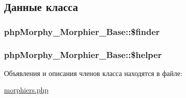 \subsection{Данные класса}
\hypertarget{classphpMorphy__Morphier__Base_a35c13fe01eec04a260e2141203ef4ada}{
\subsubsection[{\$finder}]{\setlength{\rightskip}{0pt plus 5cm}phpMorphy\_\-Morphier\_\-Base::\$finder}}
\label{classphpMorphy__Morphier__Base_a35c13fe01eec04a260e2141203ef4ada}
\hypertarget{classphpMorphy__Morphier__Base_a1ca50fed8d155ae3b1d5c4d498a9201a}{
\subsubsection[{\$helper}]{\setlength{\rightskip}{0pt plus 5cm}phpMorphy\_\-Morphier\_\-Base::\$helper}}
\label{classphpMorphy__Morphier__Base_a1ca50fed8d155ae3b1d5c4d498a9201a}


Объявления и описания членов класса находятся в файле:\begin{DoxyCompactItemize}
\item 
\hyperlink{morphiers_8php}{morphiers.php}\end{DoxyCompactItemize}
